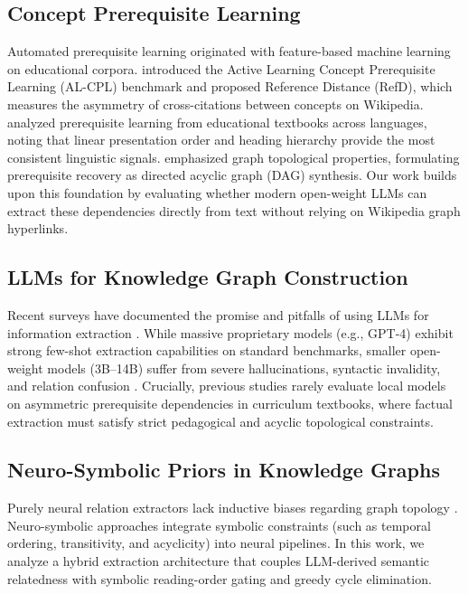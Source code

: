 \documentclass[11pt,a4paper]{article}
\begin{document}
\subsection{Concept Prerequisite Learning}
Automated prerequisite learning originated with feature-based machine learning on educational corpora. \citet{liang2015prereq} introduced the Active Learning Concept Prerequisite Learning (AL-CPL) benchmark and proposed Reference Distance (RefD), which measures the asymmetry of cross-citations between concepts on Wikipedia. \citet{alzetta2020prereq} analyzed prerequisite learning from educational textbooks across languages, noting that linear presentation order and heading hierarchy provide the most consistent linguistic signals. \citet{chen2018prereq} emphasized graph topological properties, formulating prerequisite recovery as directed acyclic graph (DAG) synthesis. Our work builds upon this foundation by evaluating whether modern open-weight LLMs can extract these dependencies directly from text without relying on Wikipedia graph hyperlinks.

\subsection{LLMs for Knowledge Graph Construction}
Recent surveys have documented the promise and pitfalls of using LLMs for information extraction \cite{trajanoska2023llm,carta2023iterative}. While massive proprietary models (e.g., GPT-4) exhibit strong few-shot extraction capabilities on standard benchmarks, smaller open-weight models (3B--14B) suffer from severe hallucinations, syntactic invalidity, and relation confusion \cite{kommineni2024llm}. Crucially, previous studies rarely evaluate local models on asymmetric prerequisite dependencies in curriculum textbooks, where factual extraction must satisfy strict pedagogical and acyclic topological constraints.

\subsection{Neuro-Symbolic Priors in Knowledge Graphs}
Purely neural relation extractors lack inductive biases regarding graph topology \cite{ji2021survey}. Neuro-symbolic approaches integrate symbolic constraints (such as temporal ordering, transitivity, and acyclicity) into neural pipelines. In this work, we analyze a hybrid extraction architecture that couples LLM-derived semantic relatedness with symbolic reading-order gating and greedy cycle elimination.
\end{document}
